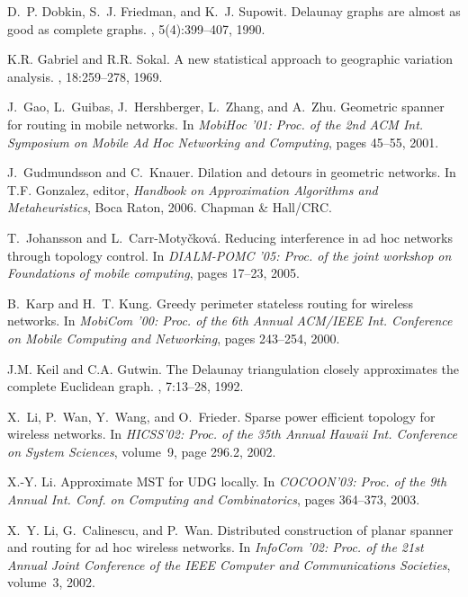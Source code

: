 \documentclass{llncs}
\begin{document}
\begin{thebibliography}{10}
D.~P. Dobkin, S.~J. Friedman, and K.~J. Supowit.
\newblock Delaunay graphs are almost as good as complete graphs.
, 5(4):399--407, 1990.

K.R. Gabriel and R.R. Sokal.
\newblock A new statistical approach to geographic variation analysis.
, 18:259--278, 1969.

J.~Gao, L.~Guibas, J.~Hershberger, L.~Zhang, and A.~Zhu.
\newblock Geometric spanner for routing in mobile networks.
\newblock In {\em Mobi{H}oc '01: Proc. of the 2nd {ACM} Int. Symposium on
  Mobile Ad Hoc Networking and Computing}, pages 45--55, 2001.

J.~Gudmundsson and C.~Knauer.
\newblock Dilation and detours in geometric networks.
\newblock In T.F. Gonzalez, editor, {\em Handbook on Approximation Algorithms
  and Metaheuristics}, Boca Raton, 2006. Chapman \& Hall/CRC.

T.~Johansson and L.~Carr-Moty\v{c}kov\'{a}.
\newblock Reducing interference in ad hoc networks through topology control.
\newblock In {\em DIALM-POMC '05: Proc. of the joint workshop on Foundations of
  mobile computing}, pages 17--23, 2005.

B.~Karp and H.~T. Kung.
\newblock Greedy perimeter stateless routing for wireless networks.
\newblock In {\em Mobi{C}om '00: Proc. of the 6th Annual ACM/IEEE Int.
  Conference on Mobile Computing and Networking}, pages 243--254, 2000.

J.M. Keil and C.A. Gutwin.
\newblock The {D}elaunay triangulation closely approximates the complete
  {E}uclidean graph.
, 7:13--28, 1992.

X.~Li, P.~Wan, Y.~Wang, and O.~Frieder.
\newblock Sparse power efficient topology for wireless networks.
\newblock In {\em HICSS'02: Proc. of the 35th Annual Hawaii Int. Conference on
  System Sciences}, volume~9, page 296.2, 2002.

X.-Y. Li.
\newblock Approximate {MST} for {UDG} locally.
\newblock In {\em COCOON'03: Proc. of the 9th Annual Int. Conf. on Computing
  and Combinatorics}, pages 364--373, 2003.

X.~Y. Li, G.~Calinescu, and P.~Wan.
\newblock Distributed construction of planar spanner and routing for ad hoc
  wireless networks.
\newblock In {\em Info{C}om '02: Proc. of the 21st Annual Joint Conference of
  the IEEE Computer and Communications Societies}, volume~3, 2002.


\end{thebibliography}
\end{document}
